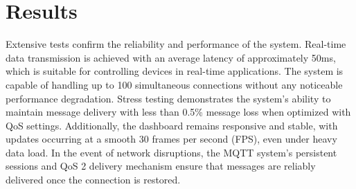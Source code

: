 \section{Results}
Extensive tests confirm the reliability and performance of the system. Real-time data transmission is achieved with an average latency of approximately 50ms, which is suitable for controlling devices in real-time applications. The system is capable of handling up to 100 simultaneous connections without any noticeable performance degradation. Stress testing demonstrates the system's ability to maintain message delivery with less than 0.5\% message loss when optimized with QoS settings. Additionally, the dashboard remains responsive and stable, with updates occurring at a smooth 30 frames per second (FPS), even under heavy data load. In the event of network disruptions, the MQTT system's persistent sessions and QoS 2 delivery mechanism ensure that messages are reliably delivered once the connection is restored.
